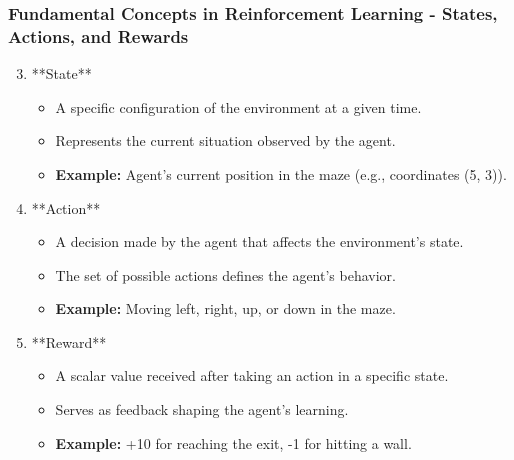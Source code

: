 \documentclass{beamer}
\begin{document}
\begin{frame}[fragile]
    \frametitle{Fundamental Concepts in Reinforcement Learning - States, Actions, and Rewards}
    \begin{enumerate}
        \setcounter{enumi}{2} %
        \item **State**
            \begin{itemize}
                \item A specific configuration of the environment at a given time.
                \item Represents the current situation observed by the agent.
                \item \textbf{Example:} Agent's current position in the maze (e.g., coordinates (5, 3)).
            \end{itemize}
        
        \item **Action**
            \begin{itemize}
                \item A decision made by the agent that affects the environment's state.
                \item The set of possible actions defines the agent's behavior.
                \item \textbf{Example:} Moving left, right, up, or down in the maze.
            \end{itemize}
        
        \item **Reward**
            \begin{itemize}
                \item A scalar value received after taking an action in a specific state.
                \item Serves as feedback shaping the agent's learning.
                \item \textbf{Example:} +10 for reaching the exit, -1 for hitting a wall.
            \end{itemize}
    \end{enumerate}
\end{frame}
\end{document}
